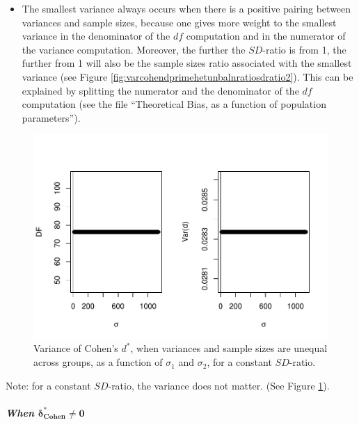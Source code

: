 \documentclass[
  english,
  man,mask]{apa6}
\providecommand{\tightlist}{%
  \setlength{\itemsep}{0pt}\setlength{\parskip}{0pt}}
\let\oldsubparagraph\subparagraph
\renewcommand{\subparagraph}[1]{\oldsubparagraph{#1}\mbox{}}
\begin{document}
\begin{itemize}
\tightlist
\item
  The smallest variance always occurs when there is a positive pairing between variances and sample sizes, because one gives more weight to the smallest variance in the denominator of the \(df\) computation and in the numerator of the variance computation. Moreover, the further the \(SD\)-ratio is from 1, the further from 1 will also be the sample sizes ratio associated with the smallest variance (see Figure \ref{fig:varcohendprimehetunbalnratiosdratio2}). This can be explained by splitting the numerator and the denominator of the \(df\) computation (see the file ``Theoretical Bias, as a function of population parameters'').
\end{itemize}

\begin{figure}
\centering
\includegraphics{SupMat1_files/figure-latex/varcohendprimehetunbalvariance2-1.pdf}
\caption{\label{fig:varcohendprimehetunbalvariance2}Variance of Cohen's \(d^*\), when variances and sample sizes are unequal across groups, as a function of \(\sigma_1\) and \(\sigma_2\), for a constant \(SD\)-ratio.}
\end{figure}

Note: for a constant \(SD\)-ratio, the variance does not matter. (See Figure \ref{fig:varcohendprimehetunbalvariance2}).

\hypertarget{when-bmdelta_cohen-neq-0-2}{%
\subparagraph{\texorpdfstring{When \(\bm{\delta^*_{Cohen} \neq 0}\)}{When \textbackslash bm\{\textbackslash delta\^{}*\_\{Cohen\} \textbackslash neq 0\}}}\label{when-bmdelta_cohen-neq-0-2}}
\end{document}
